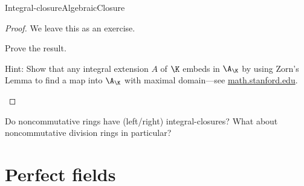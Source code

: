 \begin{thm}{Integral-closure}{AlgebraicClosure}
\begin{proof}
		We leave this as an exercise.
		\begin{exr}[breakable=false]{}{}
			Prove the result.
			\begin{rmk}
				Hint:  Show that any integral extension $A$ of $\K$ embeds in $\A _{\K}$ by using Zorn's Lemma to find a map into $\A _{\K}$ with maximal domain---see \href{http://math.stanford.edu/~conrad/121Page/handouts/algclosure.pdf}{math.stanford.edu}.
			\end{rmk}
		\end{exr}
	\end{proof}
\end{thm}
\begin{exr}{}{}
	Do noncommutative rings have (left/right) integral-closures?  What about noncommutative division rings in particular?  
\end{exr}

\section{Perfect fields}

